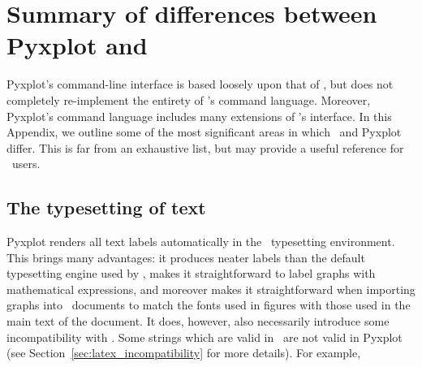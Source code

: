 %
%
%
%
%



\chapter{Summary of differences between Pyxplot and \gnuplot}
\label{ch:gnuplot_diffs}

Pyxplot's command-line interface is based loosely upon that of \gnuplot, but
does not completely re-implement the entirety of \gnuplot's command language.
Moreover, Pyxplot's command language includes many extensions of \gnuplot's
interface. In this Appendix, we outline some of the most significant areas in
which \gnuplot\ and Pyxplot differ. This is far from an exhaustive list, but
may provide a useful reference for \gnuplot\ users.

\section{The typesetting of text}

Pyxplot renders all text labels automatically in the \latexdcf\ typesetting
environment. This brings many advantages: it produces neater labels than the
default typesetting engine used by \gnuplot, makes it straightforward to label
graphs with mathematical expressions, and moreover makes it straightforward
when importing graphs into \latexdcf\ documents to match the fonts used in figures
with those used in the main text of the document.  It does, however, also
necessarily introduce some incompatibility with \gnuplot.  Some strings which
are valid in \gnuplot\ are not valid in Pyxplot (see
Section~\ref{sec:latex_incompatibility} for more details). For
example,


